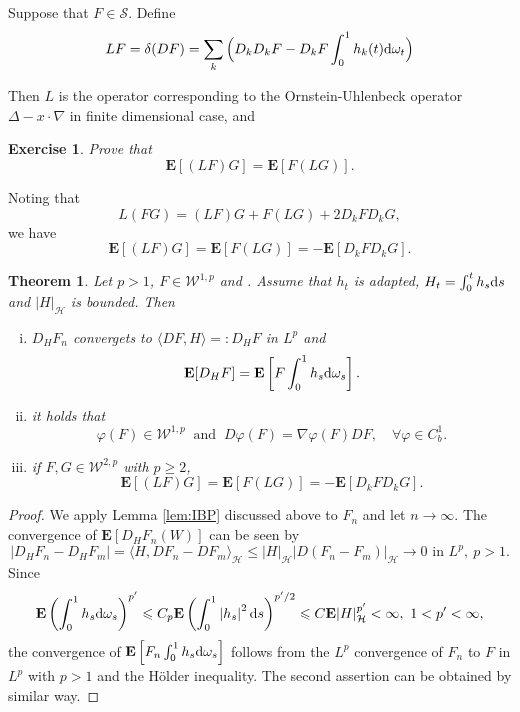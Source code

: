 \documentclass[twoside, 12pt]{book}
\numberwithin{equation}{chapter}
\newtheorem{theorem}{Theorem}[section]
\newtheorem{exercise}{Exercise}[section]
\def\cH{{\mathcal H}}
\def\cS{{\mathcal S}}
\def\bE{{\mathbf E}}
\def\sW{{\mathscr W}}
\def\l{\left}
\def\r{\right}
\def\<{\langle}
\def\>{\rangle}
\def\geq{\geqslant}
\def\leq{\leqslant}
\def\d{\text{\rm{d}}}
\begin{document}
   
   
    Suppose that $F\in \cS$. Define 
   \[
       L F =\delta (D F)= \sum_k \Big(D_kD_kF-D_k F \int_0^1 h_k(t) \d \omega_t\Big)
   \]

    \medspace
    
    
   
    Then $L$ is the operator corresponding to the Ornstein-Uhlenbeck operator $\Delta-x\cdot \nabla$ in finite dimensional case, and 
    \begin{exercise}
    	Prove that 
    	\[
    	    \bE [(LF)G]=\bE [F (LG)]. 
    	\]
    \end{exercise}
    Noting that 
    \[
        L(FG)=(LF) G+ F(LG)+2D_kFD_kG, 
    \]
    we have 
    \begin{equation*}
    	\bE [(LF)G]=\bE [F (LG)]=-\bE [D_kFD_kG]. 
    \end{equation*}
    
    
    \begin{theorem}\label{thm:IBP}
         Let $p > 1$, $F\in \sW^{1,p}$ and . Assume that $h_t$ is adapted, $H_t=\int_0^t h_s \d s$ and $|H|_{\cH}$ is bounded. Then 
         \begin{enumerate}[(i)]
         	\item   $D_HF_n$ convergets to $\<DF, H\>=:D_H F$ in $L^p$ and 
         	\[
         	    \mathbf{E}[D_H F] =\mathbf{E}\left[F \int_0^1 h_s \d \omega_s\right]. 
         	\]
         	\item it holds that 
         	\[
         	    \varphi(F)\in \sW^{1,p} ~ \mbox{ and }~ D \varphi(F)=\nabla \varphi(F)D F, \quad \forall \varphi\in C^1_b. 
         	\]
         	\item if $F,G\in \sW^{2,p}$  with $p\geq 2$, 
         	\begin{equation}
         		\bE [(LF)G]=\bE [F (LG)]=-\bE [D_kFD_kG]. 
         	\end{equation}
         \end{enumerate}
    \end{theorem}
   \begin{proof}
   	We apply Lemma \ref{lem:IBP} discussed above to $F_n$ and let $n \rightarrow \infty$. The convergence of $\mathbf{E}\left[D_H F_n(W)\right]$ can be seen by 
   	$$
   	|D_HF_n-D_H F_m|=\<H, DF_{n}-DF_{m}\>_{\cH} \leq |H|_{\cH} |D(F_n-F_m)|_{\cH} \to 0 \mbox{ in } L^p, ~ p > 1. 
   	$$
   	Since 
   	\[
   	\mathbf{E}\left(\int_0^1 h_s \d \omega_s\right)^{p'}\leq C_p\mathbf{E} \l(\int_0^1\left|h_s\right|^2\d s\r)^{p'/2} \leq C\bE |H|_{\cH}^{p'}<\infty, ~ 1<p'<\infty, 
   	\] 
   	the convergence of $\mathbf{E}\left[F_n \int_0^1 h_s \d \omega_s\right]$ follows from the $L^p$ convergence of $F_n$ to $F$ in $L^p$ with $p >1$ and the Hölder inequality. The second assertion can be obtained by similar way. 
   \end{proof}
    
\end{document}

